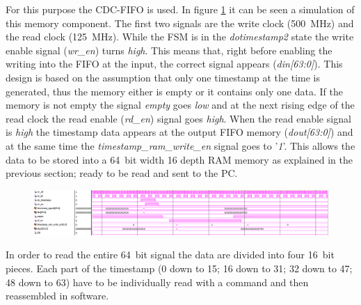 For this purpose the CDC-FIFO is used.
In figure \ref{fig:timestampfifo} it can be seen a simulation of this memory component. 
The first two signals are the write clock (500~MHz) and the read clock (125~MHz).
While the FSM is in the \textit{dotimestamp2} state the write enable signal (\textit{wr\_en}) turns \textit{high}.
This means that, right before enabling the writing into the FIFO at the input, the correct signal appears (\textit{din[63:0]}). 
This design is based on the assumption that only one timestamp at the time is generated, thus the memory either is empty or it contains only one data.
If the memory is not empty the signal \textit{empty} goes \textit{low} and at the next rising edge of the read clock the read enable (\textit{rd\_en}) signal goes \textit{high}.
When the read enable signal is \textit{high} the timestamp data appears at the output FIFO memory (\textit{dout[63:0]}) and at the same time the \textit{timestamp\_ram\_write\_en} signal goes to '\textit{1}'.
This allows the data to be stored into a 64~bit width 16 depth RAM memory as explained in the previous section; ready to be read and sent to the PC.
\begin{figure}[H]
	\centering
	\includegraphics[width=1.0\linewidth]{IMG/ch4/TIMESTAMPsimulations/TIMESTAMPFIFO}
	\caption{}
	\label{fig:timestampfifo}
\end{figure}
\noindent In order to read the entire 64~bit signal the data are divided into four 16~bit pieces. Each part of the timestamp (0 down to 15; 16 down to 31; 32 down to 47; 48 down to 63) have to be individually read with a command and then reassembled in software. 

